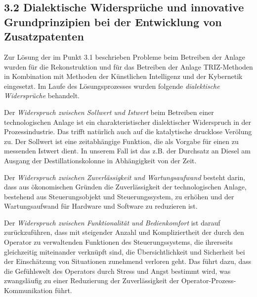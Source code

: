 \documentclass[11pt,a4paper]{article}
\begin{document}
\subsection*{3.2 Dialektische Widersprüche und innovative Grundprinzipien bei
  der Entwicklung von Zusatzpatenten} 

Zur Lösung der im Punkt 3.1 beschrieben Probleme beim Betreiben der Anlage
wurden für die Rekonstruktion und für das Betreiben der Anlage TRIZ-Methoden in
Kombination mit Methoden der Künstlichen Intelligenz und der Kybernetik
eingesetzt. Im Laufe des Lösungsprozesses wurden folgende \emph{dialektische
Widersprüche} behandelt.

Der \emph{Widerspruch zwischen Sollwert und Istwert} beim Betreiben einer
technologischen Anlage ist ein charakteristischer dialektischer Widerspruch in
der Prozessindustrie. Das trifft natürlich auch auf die katalytische drucklose
Verölung zu. Der Sollwert ist eine zeitabhängige Funktion, die als Vorgabe für
einen zu messenden Istwert dient. In unserem Fall ist das z.B. der Durchsatz an
Diesel am Ausgang der Destillationskolonne in Abhängigkeit von der Zeit.

Der \emph{Widerspruch zwischen Zuverlässigkeit und Wartungsaufwand} besteht
darin, dass aus ökonomischen Gründen die Zuverlässigkeit der technologischen
Anlage, bestehend aus Steuerungsobjekt und Steuerungssystem, zu erhöhen und der
Wartungsaufwand für Hardware und Software zu reduzieren ist.

Der \emph{Widerspruch zwischen Funktionalität und Bedienkomfort} ist darauf
zurückzuführen, dass mit steigender Anzahl und Kompliziertheit der durch den
Operator zu verwaltenden Funktionen des Steuerungssystems, die ihrerseits
gleichzeitig miteinander verknüpft sind, die Übersichtlichkeit und Sicherheit
bei der Einschätzung von Situationen zunehmend verloren geht. Das führt dazu,
dass die Gefühlswelt des Operators durch Stress und Angst bestimmt wird, was
zwangsläufig zu einer Reduzierung der Zuverlässigkeit der
Operator-Prozess-Kommunikation führt.
\end{document}
